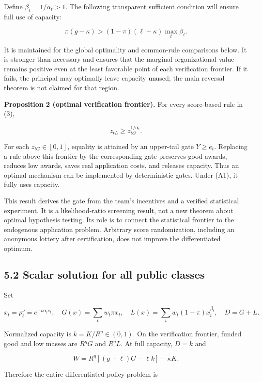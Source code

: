 \documentclass[
  11pt,
]{article}
\begin{document}
Define \(\beta_t=1/\alpha_t>1\). The following transparent sufficient
condition will ensure full use of capacity:

\[\pi(g-\kappa)>(1-\pi)(\ell+\kappa)\max_t\beta_t. \tag{A1}\]

It is maintained for the global optimality and common-rule comparisons
below. It is stronger than necessary and ensures that the marginal
organizational value remains positive even at the least favorable point
of each verification frontier. If it fails, the principal may optimally
leave capacity unused; the main reversal theorem is not claimed for that
region.

\textbf{Proposition 2 (optimal verification frontier).} For every
score-based rule in (3),

\[z_{tL}\geq z_{tG}^{1/\alpha_t}. \tag{10}\]

For each \(z_{tG}\in[0,1]\), equality is attained by an upper-tail gate
\(Y\geq e_t\). Replacing a rule above this frontier by the corresponding
gate preserves good awards, reduces low awards, saves real application
costs, and releases capacity. Thus an optimal mechanism can be
implemented by deterministic gates. Under (A1), it fully uses capacity.

This result derives the gate from the team's incentives and a verified
statistical experiment. It is a likelihood-ratio screening result, not a
new theorem about optimal hypothesis testing. Its role is to connect the
statistical frontier to the endogenous application problem. Arbitrary
score randomization, including an anonymous lottery after certification,
does not improve the differentiated optimum.

\subsection{5.2 Scalar solution for all public
classes}\label{scalar-solution-for-all-public-classes}

Set

\[x_t=p_t^{\nu}=e^{-\nu\alpha_t e_t},\quad
G(x)=\sum_t w_t\pi x_t,\quad
L(x)=\sum_t w_t(1-\pi)x_t^{\beta_t},\quad D=G+L. \tag{11}\]

Normalized capacity is \(k=K/R^{\eta}\in(0,1)\). On the verification
frontier, funded good and low masses are \(R^{\eta}G\) and
\(R^{\eta}L\). At full capacity, \(D=k\) and

\[W=R^{\eta}[(g+\ell)G-\ell k]-\kappa K. \tag{12}\]

Therefore the entire differentiated-policy problem is
\end{document}

